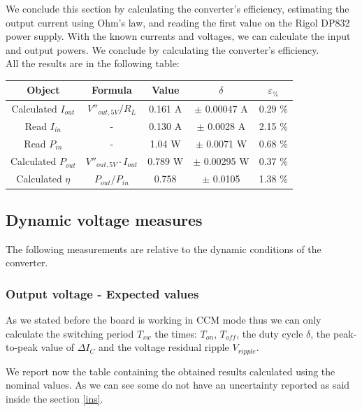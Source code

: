 \documentclass[../main.tex]{subfiles}
\begin{document}
We conclude this section by calculating the converter’s efficiency, estimating the output current using Ohm’s law, and reading the first value on the Rigol DP832 power supply. With the known currents and voltages, we can calculate the input and output powers. We conclude by calculating the converter’s efficiency.\\

All the results are in the following table:


\begin{center}
\begin{tabular}{c c c c c}
\textbf{Object} & \textbf{Formula} & \textbf{Value} & $\delta$ & $\varepsilon_{\%}$ \\
\hline
Calculated $I_{out}$ & $V''_{out,5V} / R_L$ & 0.161 A & $\pm$ 0.00047 A & 0.29 \% \\ 
\hline
Read $I_{in}$ & - &  0.130 A & $\pm$ 0.0028 A & 2.15 \% \\ 
\hline
Read $P_{in}$ & - & 1.04 W & $\pm$ 0.0071 W & 0.68 \%\\ 
\hline
Calculated $P_{out}$ & $V''_{out,5V} \cdot I_{out}$ &  0.789 W & $\pm$ 0.00295 W & 0.37 \% \\ 
\hline
Calculated $\eta$ & $P_{out}/P_{in}$ & 0.758 & $\pm$ 0.0105 & 1.38 \%  \\ 
\end{tabular}
\end{center}

\subsection*{Dynamic voltage measures}

The following measurements are relative to the dynamic conditions of the converter.

\subsubsection*{Output voltage - Expected values}

As we stated before the board is working in CCM mode thus we can only calculate the switching period $T_{sw}$ the times: $T_{on}$, $T_{off}$, the duty cycle $\delta$, the peak-to-peak value of $\Delta I_C$ and the voltage residual ripple $V_{ripple}$.

We report now the table containing the obtained results calculated using the nominal values. As we can see some do not have an uncertainty reported as said inside the section \ref{ins}.
\end{document}
